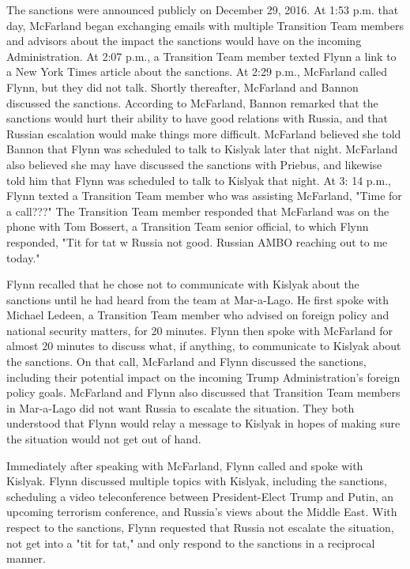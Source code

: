 The sanctions were announced publicly on December 29, 2016.%
At 1:53 p.m. that day, McFarland began exchanging emails with multiple Transition Team members and advisors about the impact the sanctions would have on the incoming Administration.%
At 2:07 p.m., a Transition Team member texted Flynn a link to a New York Times article about the sanctions.%
At 2:29 p.m., McFarland called Flynn, but they did not talk.%
Shortly thereafter, McFarland and Bannon discussed the sanctions.%
According to McFarland, Bannon remarked that the sanctions would hurt their ability to have good relations with Russia, and that Russian escalation would make things more difficult.%
McFarland believed she told Bannon that Flynn was scheduled to talk to Kislyak later that night.%
McFarland also believed she may have discussed the sanctions with Priebus, and likewise told him that Flynn was scheduled to talk to Kislyak that night.%
At 3: 14 p.m., Flynn texted a Transition Team member who was assisting McFarland, "Time for a call???"%
The Transition Team member responded that McFarland was on the phone with Tom Bossert, a Transition Team senior official, to which Flynn responded, "Tit for tat w Russia not good.
Russian AMBO reaching out to me today."%

Flynn recalled that he chose not to communicate with Kislyak about the sanctions until he had heard from the team at Mar-a-Lago.%
He first spoke with Michael Ledeen,%
a Transition Team member who advised on foreign policy and national security matters, for 20 minutes.%
Flynn then spoke with McFarland for almost 20 minutes to discuss what, if anything, to communicate to Kislyak about the sanctions.%
On that call, McFarland and Flynn discussed the sanctions, including their potential impact on the incoming Trump Administration's foreign policy goals.%
McFarland and Flynn also discussed that Transition Team members in Mar-a-Lago did not want Russia to escalate the situation.%
They both understood that Flynn would relay a message to Kislyak in hopes of making sure the situation would not get out of hand.%

Immediately after speaking with McFarland, Flynn called and spoke with Kislyak.%
Flynn discussed multiple topics with Kislyak, including the sanctions, scheduling a video teleconference between President-Elect Trump and Putin, an upcoming terrorism conference, and Russia's views about the Middle East.%
With respect to the sanctions, Flynn requested that Russia not escalate the situation, not get into a "tit for tat," and only respond to the sanctions in a reciprocal manner.%

